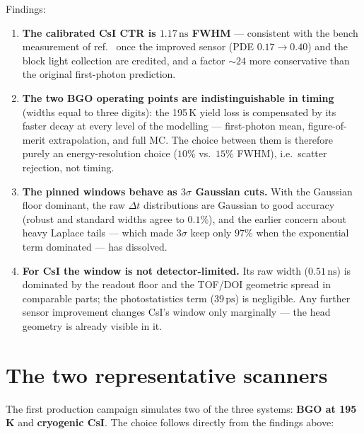 \documentclass[11pt,a4paper]{article}
\newcommand{\ns}{\,\mathrm{ns}}
\newcommand{\ps}{\,\mathrm{ps}}
\begin{document}
Findings:
\begin{enumerate}
\item \textbf{The calibrated CsI CTR is $1.17\ns$ FWHM} --- consistent with the bench
  measurement of ref.~\cite{Soleti2024} once the improved sensor (PDE $0.17 \to 0.40$) and the
  block light collection are credited, and a factor ${\sim}24$ more conservative than the
  original first-photon prediction.
\item \textbf{The two BGO operating points are indistinguishable in timing} (widths equal to
  three digits): the 195\,K yield loss is compensated by its faster decay at every level of the
  modelling --- first-photon mean, figure-of-merit extrapolation, and full MC. The choice
  between them is therefore purely an energy-resolution choice ($10\%$ vs.\ $15\%$ FWHM),
  i.e.\ scatter rejection, not timing.
\item \textbf{The pinned windows behave as $3\sigma$ Gaussian cuts.} With the Gaussian floor
  dominant, the raw $\Delta t$ distributions are Gaussian to good accuracy (robust and standard
  widths agree to $0.1\%$), and the earlier concern about heavy Laplace tails --- which made
  $3\sigma$ keep only $97\%$ when the exponential term dominated --- has dissolved.
\item \textbf{For CsI the window is not detector-limited.} Its raw width
  ($0.51\ns$) is dominated by the readout floor and the TOF/DOI geometric spread in comparable
  parts; the photostatistics term ($39\ps$) is negligible. Any further sensor improvement
  changes CsI's window only marginally --- the head geometry is already visible in it.
\end{enumerate}

\section{The two representative scanners}
\label{sec:twoscanners}

The first production campaign simulates two of the three systems: \textbf{BGO at 195\,K} and
\textbf{cryogenic CsI}. The choice follows directly from the findings above:
\end{document}
